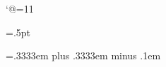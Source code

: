 %
%
%

\catcode`@=11                                   %

\newdimen\colwidth                              %
\newdimen\pagewidth                             %
\newdimen\pageheight                            %
\newdimen{}          {}=.5pt          %
\newdimen\colmaxdepth     \colmaxdepth=4pt      %
                                                
\newdimen\@bigColHeight         %
\newdimen\@saveSplitmax         %
\newdimen\@saveVsize            %
\newskip\s@veskip               %
\newskip\doublecolskip          %
\doublecolskip=.3333em plus .3333em minus .1em  %

\newdimen\@leftpluscenter       %

\newbox\partialpage             %

\newif\ifleftc@lumn             %
\newif\if@wid                   %
\newif\if@bot                   %

\def\@LET{\global\let}          %

%


